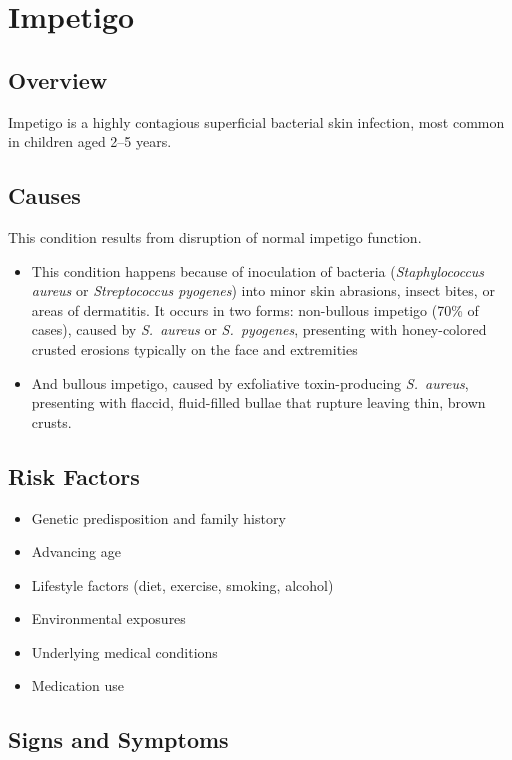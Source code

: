 \chapter{Impetigo}
\label{sec:Impetigo}

\section{Overview}
Impetigo is a highly contagious superficial bacterial skin infection, most common in children aged 2--5 years.
\section{Causes}
This condition results from disruption of normal impetigo function.

\begin{itemize}[noitemsep]
  \item This condition happens because of inoculation of bacteria (\textit{Staphylococcus aureus} or \textit{Streptococcus pyogenes}) into minor skin abrasions, insect bites, or areas of dermatitis. It occurs in two forms: non-bullous impetigo (70\% of cases), caused by \textit{S.~aureus} or \textit{S.~pyogenes}, presenting with honey-colored crusted erosions typically on the face and extremities
  \item And bullous impetigo, caused by exfoliative toxin-producing \textit{S.~aureus}, presenting with flaccid, fluid-filled bullae that rupture leaving thin, brown crusts.
\end{itemize}
\section{Risk Factors}


\begin{itemize}[noitemsep]
  \item Genetic predisposition and family history
  \item Advancing age
  \item Lifestyle factors (diet, exercise, smoking, alcohol)
  \item Environmental exposures
  \item Underlying medical conditions
  \item Medication use
\end{itemize}
\section{Signs and Symptoms}


